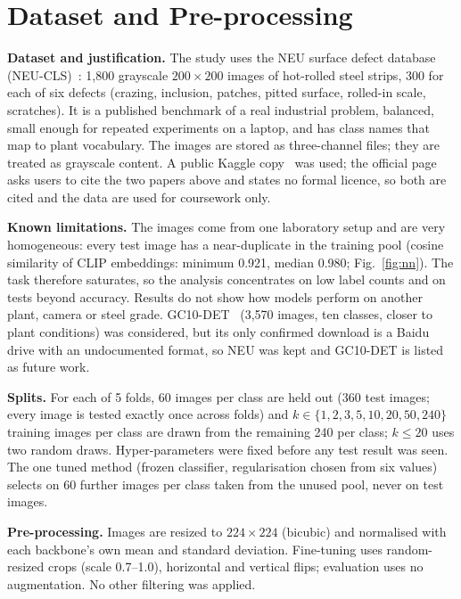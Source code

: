 \documentclass[11pt,a4paper]{article}
\begin{document}
\section{Dataset and Pre-processing}
\textbf{Dataset and justification.} The study uses the NEU surface defect database (NEU-CLS)~\cite{neu2013,neu2020}: 1,800 grayscale $200\times200$ images of hot-rolled steel strips, 300 for each of six defects (crazing, inclusion, patches, pitted surface, rolled-in scale, scratches). It is a published benchmark of a real industrial problem, balanced, small enough for repeated experiments on a laptop, and has class names that map to plant vocabulary. The images are stored as three-channel files; they are treated as grayscale content. A public Kaggle copy~\cite{neukaggle} was used; the official page asks users to cite the two papers above and states no formal licence, so both are cited and the data are used for coursework only.

\textbf{Known limitations.} The images come from one laboratory setup and are very homogeneous: every test image has a near-duplicate in the training pool (cosine similarity of CLIP embeddings: minimum 0.921, median 0.980; Fig.~\ref{fig:nn}). The task therefore saturates, so the analysis concentrates on low label counts and on tests beyond accuracy. Results do not show how models perform on another plant, camera or steel grade. GC10-DET~\cite{gc10} (3,570 images, ten classes, closer to plant conditions) was considered, but its only confirmed download is a Baidu drive with an undocumented format, so NEU was kept and GC10-DET is listed as future work.

\textbf{Splits.} For each of 5 folds, 60 images per class are held out (360 test images; every image is tested exactly once across folds) and $k\in\{1,2,3,5,10,20,50,240\}$ training images per class are drawn from the remaining 240 per class; $k\le20$ uses two random draws. Hyper-parameters were fixed before any test result was seen. The one tuned method (frozen classifier, regularisation chosen from six values) selects on 60 further images per class taken from the unused pool, never on test images.

\textbf{Pre-processing.} Images are resized to $224\times224$ (bicubic) and normalised with each backbone's own mean and standard deviation. Fine-tuning uses random-resized crops (scale 0.7--1.0), horizontal and vertical flips; evaluation uses no augmentation. No other filtering was applied.
\end{document}
